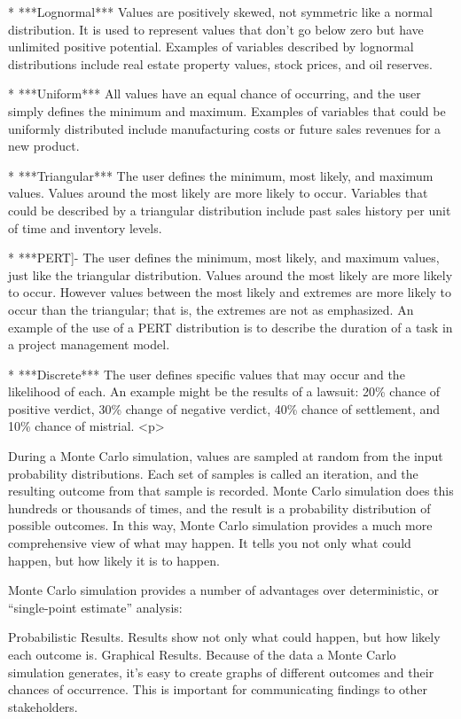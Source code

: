 * ***Lognormal*** Values are positively skewed, not symmetric like a normal distribution.  It is used to represent values that don’t go below zero but have unlimited positive potential.  Examples of variables described by lognormal distributions include real estate property values, stock prices, and oil reserves.

* ***Uniform*** All values have an equal chance of occurring, and the user simply defines the minimum and maximum.  Examples of variables that could be uniformly distributed include manufacturing costs or future sales revenues for a new product.

* ***Triangular*** The user defines the minimum, most likely, and maximum values.  Values around the most likely are more likely to occur.  Variables that could be described by a triangular distribution include past sales history per unit of time and inventory levels.

* ***PERT]- The user defines the minimum, most likely, and maximum values, just like the triangular distribution.  Values around the most likely are more likely to occur.  However values between the most likely and extremes are more likely to occur than the triangular; that is, the extremes are not as emphasized.  An example of the use of a PERT distribution is to describe the duration of a task in a project management model.

* ***Discrete*** The user defines specific values that may occur and the likelihood of each.  An example might be the results of a lawsuit: 20\% chance of positive verdict, 30\% change of negative verdict, 40\% chance of settlement, and 10\% chance of mistrial.
<p>

During a Monte Carlo simulation, values are sampled at random from the input probability distributions.  Each set of samples is called an iteration, and the resulting outcome from that sample is recorded.  Monte Carlo simulation does this hundreds or thousands of times, and the result is a probability distribution of possible outcomes.  In this way, Monte Carlo simulation provides a much more comprehensive view of what may happen.  It tells you not only what could happen, but how likely it is to happen.

Monte Carlo simulation provides a number of advantages over deterministic, or “single-point estimate” analysis:

Probabilistic Results. Results show not only what could happen, but how likely each outcome is.
Graphical Results. Because of the data a Monte Carlo simulation generates, it’s easy to create graphs of different outcomes and their chances of occurrence.  This is important for communicating findings to other stakeholders.

